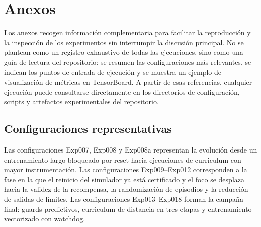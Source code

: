 \chapter{Anexos} \label{chp:anexo}

Los anexos recogen información complementaria para facilitar la reproducción y
la inspección de los experimentos sin interrumpir la discusión principal. No se
plantean como un registro exhaustivo de todas las ejecuciones, sino como una guía
de lectura del repositorio: se resumen las configuraciones más relevantes, se
indican los puntos de entrada de ejecución y se muestra un ejemplo de visualización
de métricas en TensorBoard. A partir de esas referencias, cualquier ejecución
puede consultarse directamente en los directorios de configuración, scripts y
artefactos experimentales del repositorio.

\section{Configuraciones representativas} \label{sct:anexos:configuraciones}

Las configuraciones Exp007, Exp008 y Exp008a representan la evolución desde un
entrenamiento largo bloqueado por reset hacia ejecuciones de curriculum con mayor
instrumentación. Las configuraciones Exp009--Exp012 corresponden a la fase en la
que el reinicio del simulador ya está certificado y el foco se desplaza hacia la
validez de la recompensa, la randomización de episodios y la reducción de salidas
de límites. Las configuraciones Exp013--Exp018 forman la campaña final: guards
predictivos, curriculum de distancia en tres etapas y entrenamiento vectorizado
con watchdog.

